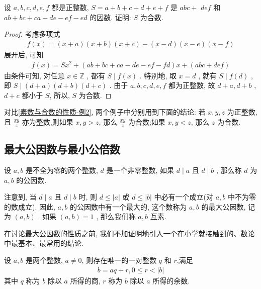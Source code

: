 \begin{example}
	设 $a ,  b ,  c ,  d ,  e ,  f$ 都是正整数,  $S=a+b+c+d+e+f$ 是 $a b c+$ $d e f$ 和 $a b+b c+c a-d e-e f-e d$ 的因数. 证明: $S$ 为合数.
\end{example}
\begin{proof}
	考虑多项式
	\begin{align*}
		f(x)=(x+a)(x+b)(x+c)-(x-d)(x-e)(x-f)
	\end{align*}
	展开后, 可知
	\begin{align*}
		f(x)=S x^{2}+(a b+b c+c a-d e-e f-f d) x+(a b c+d e f)
	\end{align*}
	由条件可知, 对任意 $x \in \mathbb{Z}$ , 都有 $S \mid f(x)$ . 特别地, 取 $x=d$ , 就有 $S \mid f(d)$ , 即 $S \mid(d+a)(d+b)(d+c)$ . 由于 $a ,  b ,  c ,  d ,  e ,  f$ 都为正整数, 故 $d+a ,  d+b$ ,  $d+c$ 都小于 $S$, 所以, $S$ 为合数.
\end{proof}
\begin{note}
	对比\autoref{素数与合数的性质-例2}, 两个例子中分别用到下面的结论: 若 $x ,  y ,  z$ 为正整数, 且 $\frac{x y}{z}$ 亦为整数,则如果 $x ,  y>z$, 那么 $\frac{x y}{z}$ 为合数;如果 $x ,  y<z$, 那么 $z$ 为合数.
\end{note}

\subsection{最大公因数与最小公倍数}
设 $a ,  b$ 是不全为零的两个整数, $d$ 是一个非零整数, 如果 $d \mid a$ 且 $d \mid b$ , 那么称 $d$ 为 $a ,  b$ 的公因数.

注意到, 当 $d \mid a$ 且 $d \mid b$ 时, 则 $d \leqslant|a|$ 或 $d \leqslant|b|$ 中必有一个成立(对 $a ,  b$ 中不为零的数成立). 因此, $a ,  b$ 的公因数中有一个最大的, 这个数称为 $a ,  b$ 的最大公因数, 记为 $(a, b)$ . 如果 $(a, b)=1$ , 那么我们称 $a ,  b$ 互素.

在讨论最大公因数的性质之前, 我们不加证明地引入一个在小学就接触到的、数论中最基本、最常用的结论.
\begin{theorem}[带余数除法]
	设 $a ,  b$ 是两个整数, $a \neq 0$, 则存在唯一的一对整数 $q$ 和 $r$,满足
	\begin{align*}
		b=a q+r, 0 \leqslant r<|b|
	\end{align*}
	其中 $q$ 称为 $b$ 除以 $a$ 所得的商, $r$ 称为 $b$ 除以 $a$ 所得的余数.\\
\end{theorem}

